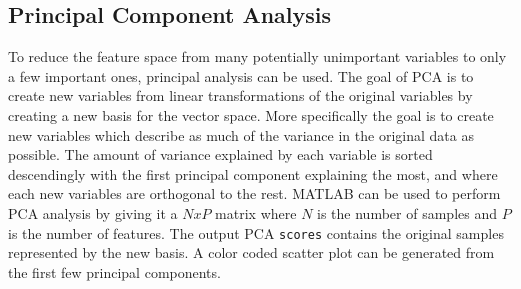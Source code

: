 \subsection{Principal Component Analysis}
To reduce the feature space from many potentially unimportant variables to only a few important ones, principal analysis can be used.
The goal of PCA is to create new variables from linear transformations of the original variables by creating a new basis for the vector space. More specifically the goal is to create new variables which describe as much of the variance in the original data as possible.
The amount of variance explained by each variable is sorted descendingly with the first principal component explaining the most, and where each new variables are orthogonal to the rest. MATLAB can be used to perform PCA analysis by giving it a $NxP$ matrix where $N$ is the number of samples and $P$ is the number of features. The output PCA \texttt{scores} contains the original samples represented by the new basis.  
A color coded scatter plot can be generated from the first few principal components. 

